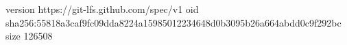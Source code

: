 version https://git-lfs.github.com/spec/v1
oid sha256:55818a3caf9fc09dda8224a15985012234648d0b3095b26a664abdd0c9f292bc
size 126508
